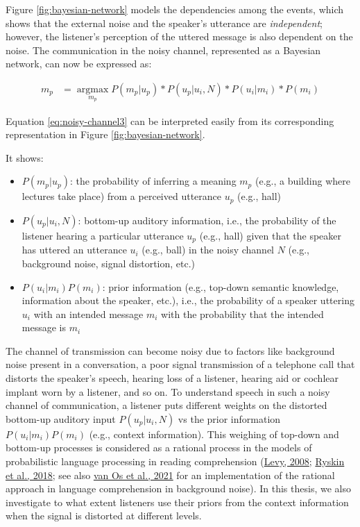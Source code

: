 \documentclass[a4paper, nobind]{templates/ociamthesis}
\providecommand{\tightlist}{%
  \setlength{\itemsep}{0pt}\setlength{\parskip}{0pt}}
\begin{document}
Figure \ref{fig:bayesian-network} models the dependencies among the events,
which shows that the external noise and the speaker's utterance are \emph{independent};
however, the listener's perception of the uttered message is also dependent on the noise.
The communication in the noisy channel, represented as a Bayesian network, can now be expressed as:

\begin{align} \label{eq:noisy-channel3}
\hat{m_p} &= \mathop{\mathrm{argmax}}\limits_{m_p} P(m_p | u_p) * P(u_p|u_i, N) * P(u_i | m_i) * P(m_i)
\end{align}

Equation \eqref{eq:noisy-channel3} can be interpreted easily from its corresponding representation in Figure \ref{fig:bayesian-network}.

It shows:

\begin{itemize}
\tightlist
\item
  \(P(m_p | u_p)\): the probability of inferring a meaning \(m_p\) (e.g., a building where lectures take place) from a perceived utterance \(u_p\) (e.g., hall)
\item
  \(P(u_p|u_i, N)\): bottom-up auditory information, i.e., the probability of the listener hearing a particular utterance \(u_p\) (e.g., hall) given that the speaker has uttered an utterance \(u_i\) (e.g., ball) in the noisy channel \(N\) (e.g., background noise, signal distortion, etc.)
\item
  \(P(u_i|m_i)P(m_i)\): prior information (e.g., top-down semantic knowledge, information about the speaker, etc.), i.e., the probability of a speaker uttering \(u_i\) with an intended message \(m_i\) with the probability that the intended message is \(m_i\)
\end{itemize}

The channel of transmission can become noisy due to factors like background noise present in a conversation,
a poor signal transmission of a telephone call that distorts the speaker's speech,
hearing loss of a listener,
hearing aid or cochlear implant worn by a listener, and so on.
To understand speech in such a noisy channel of communication, a listener puts different weights on the distorted bottom-up auditory input \(P(u_p|u_i, N)\) vs the prior information \(P(u_i|m_i)P(m_i)\) (e.g., context information).
This weighing of top-down and bottom-up processes is considered as a rational process in the models of probabilistic language processing in reading comprehension (\protect\hyperlink{ref-Levy2008}{Levy, 2008}; \protect\hyperlink{ref-Ryskin2018}{Ryskin et al., 2018}; see also \protect\hyperlink{ref-vanOs2021}{van Os et al., 2021} for an implementation of the rational approach in language comprehension in background noise).
In this thesis, we also investigate to what extent listeners use their priors from the context information when the signal is distorted at different levels.
\end{document}
